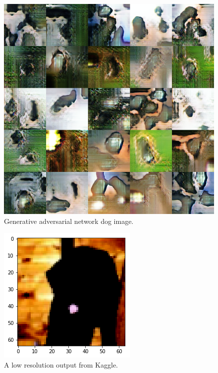 \documentclass[10pt,twocolumn,letterpaper]{article}
\begin{document}
\begin{figure}
  \includegraphics[width=0.8\linewidth]{images/results.png}
  \caption{Generative adversarial network dog image.}
  \label{fig:results}
\end{figure}


\begin{figure}
  \includegraphics[width=0.8\linewidth]{images/low_resolution.png}
  \caption{A low resolution output from Kaggle.}
  \label{fig:low_resolution}
\end{figure}

\end{document}
